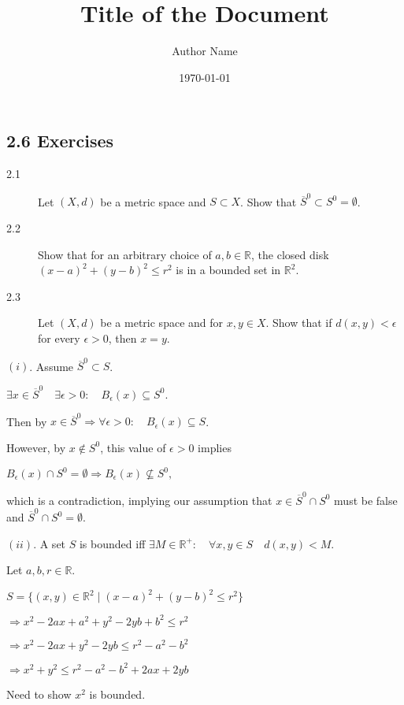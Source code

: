 \documentclass{article}
\title{\textbf{Title of the Document}}
\author{Author Name}
\date{\today}
\theoremstyle{definition}
\numberwithin{equation}{section}
\begin{document}
\maketitle
\tableofcontents
\newpage
\subsection*{2.6 Exercises}
\begin{description}
\item[2.1] Let $(X, d)$ be a metric space and $S \subset X$. Show that $\overline{S}^0 \subset S^0 = \emptyset$.
\item[2.2] Show that for an arbitrary choice of $a, b \in \mathbb{R}$, the closed disk $(x - a)^2 + (y - b)^2 \leq r^2$ is in a bounded set in $\mathbb{R}^2$.
\item[2.3] Let $(X, d)$ be a metric space and for $x, y \in X$. Show that if $d(x, y) < \epsilon$ for every $\epsilon > 0$, then $x = y$.
\end{description}

\bigskip

$(i)$. Assume $\overline{S}^0 \subset S$.

$
\exists x \in \overline{S}^0 \quad \exists \epsilon > 0: \quad B_{\epsilon}(x) \subseteq S^0.
$

Then by $x \in \overline{S}^0 \Rightarrow \forall \epsilon > 0: \quad B_{\epsilon}(x) \subseteq S$.

However, by $x \notin S^0$, this value of $\epsilon > 0$ implies 

$
B_{\epsilon}(x) \cap S^0 = \emptyset \Rightarrow B_{\epsilon}(x) \nsubseteq S^0,
$

which is a contradiction, implying our assumption that $x \in \overline{S}^0 \cap S^0$ must be false and $\overline{S}^0 \cap S^0 = \emptyset$.

\bigskip

$(ii)$. A set $S$ is bounded iff
$
\exists M \in \mathbb{R}^+ :\quad \forall x, y \in S \quad d(x, y) < M.
$

Let $a, b, r \in \mathbb{R}$.

$
S = \{(x, y) \in \mathbb{R}^2 \mid (x - a)^2 + (y - b)^2 \leq r^2\}
$

$
\Rightarrow x^2 - 2ax + a^2 + y^2 - 2yb + b^2 \leq r^2
$

$
\Rightarrow x^2 - 2ax + y^2 - 2yb \leq r^2 - a^2 - b^2
$

$
\Rightarrow x^2 + y^2 \leq r^2 - a^2 - b^2 + 2ax + 2yb
$

Need to show $x^2$ is bounded.
\end{document}
